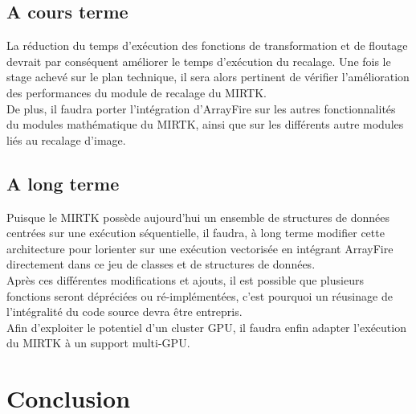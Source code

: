 \documentclass[10pt]{report}
\begin{document}
	\section{A cours terme}
	 La réduction du temps d'exécution des fonctions de transformation et de floutage devrait par conséquent améliorer le temps d'exécution du recalage. Une fois le stage achevé sur le plan technique, il sera alors pertinent de vérifier l'amélioration des performances du module de recalage du MIRTK.\\
	 De plus, il faudra porter l'intégration d'ArrayFire sur les autres fonctionnalités du modules mathématique du MIRTK, ainsi que sur les différents autre modules liés au recalage d'image.

	\section{A long terme}
	Puisque le MIRTK possède aujourd'hui un ensemble de structures de données centrées sur une exécution séquentielle, il faudra, à long terme modifier cette architecture pour lorienter sur une exécution vectorisée en intégrant ArrayFire directement dans ce jeu de classes et de structures de données.\\
	Après ces différentes modifications et ajouts, il est possible que plusieurs fonctions seront dépréciées ou ré-implémentées, c'est pourquoi un réusinage de l'intégralité du code source devra être entrepris.\\  
	Afin d'exploiter le potentiel d'un cluster GPU, il faudra enfin adapter l'exécution du MIRTK à un support multi-GPU.  

\chapter*{Conclusion} 
\end{document}
